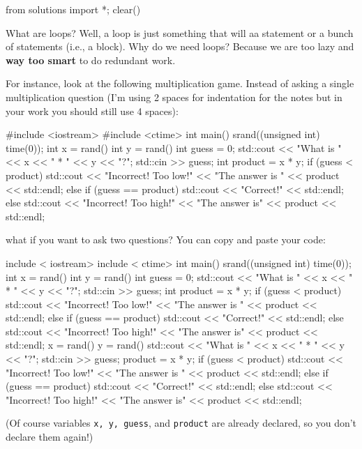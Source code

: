 \begin{python0}
from solutions import *; clear()
\end{python0}

What are loops? Well, a loop is just something that will  aa statement or a bunch of statements (i.e., a block).
Why do we need loops? Because we are too lazy and \textbf{way too smart} to do redundant work.

For instance, look at the following multiplication game. Instead of asking
a single multiplication question (I'm using 2 spaces for indentation for the
notes but in your work you should still use 4 spaces):
\begin{console}
#include <iostream>
#include <ctime>
int main()
  {
    srand((unsigned int) time(0));
    int x = rand() %
    int y = rand() %
    int guess = 0;
    std::cout << "What is " << x << " * " << y << "?";
    std::cin >> guess;
    int product = x * y;
    if (guess < product)
    {
      std::cout << "Incorrect! Too low!"
      << "The answer is " << product
      << std::endl;
    }
    else if (guess == product)
    {
      std::cout << "Correct!" << std::endl;
    }
    else
    {
      std::cout << "Incorrect! Too high!"
      << "The answer is" << product
      << std::endl;
    }
}
\end{console}
what if you want to ask two questions? You can copy and paste your code:
\begin{console}
include < iostream>
include < ctime>
int main()
{
    srand((unsigned int) time(0));
    int x = rand() %
    int y = rand() %
    int guess = 0;
    std::cout << "What is " << x << " * " << y << "?";
    std::cin >> guess;
    int product = x * y;
    if (guess < product)
    {
      std::cout << "Incorrect! Too low!"
      << "The answer is " << product
      << std::endl;
    }
    else if (guess == product)
    {
      std::cout << "Correct!" << std::endl;
    }
    else
    {
      std::cout << "Incorrect! Too high!"
      << "The answer is" << product
      << std::endl;
    }
    x = rand() %
    y = rand() %
    std::cout << "What is " << x << " * " << y << "?";
    std::cin >> guess;
    product = x * y;
    if (guess < product)
    {
      std::cout << "Incorrect! Too low!"
      << "The answer is " << product
      << std::endl;
    }
    else if (guess == product)
    {
      std::cout << "Correct!" << std::endl;
    }
    else
    {
      std::cout << "Incorrect! Too high!"
      << "The answer is" << product
      << std::endl;
    }
}
\end{console}
(Of course variables \verb!x, y, guess!, and \verb!product! are already declared, so
you don’t declare them again!)\\\\


